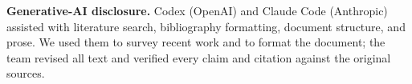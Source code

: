 \documentclass{article}
\begin{document}
\clearpage
{\footnotesize\textbf{Generative-AI disclosure.} Codex (OpenAI) and Claude Code
(Anthropic) assisted with literature search, bibliography formatting, document
structure, and prose. We used them to survey recent work and to format the
document; the team revised all text and verified every claim and citation against
the original sources.}

{\small

}
\end{document}
